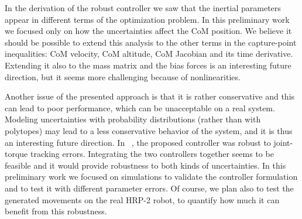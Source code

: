 \documentclass[a4paper,11pt,twoside]{StyleThese}
\begin{document}
In the derivation of the robust controller we saw that the inertial parameters appear in different terms of the optimization problem.
In this preliminary work we focused only on how the uncertainties affect the CoM position.
We believe it should be possible to extend this analysis to the other terms in the capture-point inequalities: CoM velocity, CoM altitude, CoM Jacobian and its time derivative. 
Extending it also to the mass matrix and the bias forces is an interesting future direction, but it seems more challenging because of nonlinearities.

Another issue of the presented approach is that it is rather conservative and this can lead to poor performance, which can be unacceptable on a real system. Modeling uncertainties with probability distributions (rather than with polytopes) may lead to a less conservative behavior of the system, and it is thus an interesting future direction. In ~\cite{DelPrete2015b}, the proposed controller was robust to joint-torque tracking errors. Integrating the two controllers together seems to be feasible and it would provide robustness to both kinds of uncertainties. In this preliminary work we focused on simulations to validate the controller formulation and to test it with different parameter errors. Of course, we plan also to test the generated movements on the real HRP-2 robot, to quantify how much it can benefit from this robustness.



\ifdefined{}
\else


\end{document}
